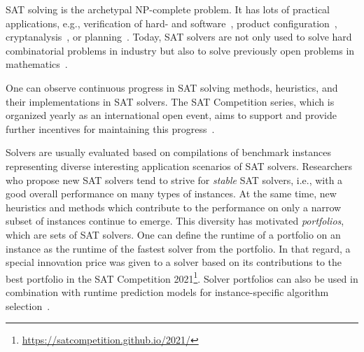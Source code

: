 \documentclass[conference]{IEEEtran}
\begin{document}
SAT solving is the archetypal NP-complete problem. It has lots of practical applications, e.g., verification of hard- and software~\cite{Kaufmann:2021:Amulet,Buning:2020:QPRVerify}, product configuration~\cite{Janota:2014:Configuration}, cryptanalysis~\cite{Nejati:2020:CDCLCrypto}, or planning~\cite{Schreiber:2021:Lilotane}. 
Today, SAT solvers are not only used to solve hard combinatorial problems in industry but also to solve previously open problems in mathematics~\cite{Heule:2016:Pyth,Heule:2018:Schur}. 

One can observe continuous progress in SAT solving methods, heuristics, and their implementations in SAT solvers. 
The SAT Competition series, which is organized yearly as an international open event, aims to support and provide further incentives for maintaining this progress~\cite{balyo2020proceedings}. %

Solvers are usually evaluated based on compilations of benchmark instances representing diverse interesting application scenarios of SAT solvers. 
Researchers who propose new SAT solvers tend to strive for \emph{stable} SAT solvers, i.e., with a good overall performance on many types of instances. 
At the same time, new heuristics and methods which contribute to the performance on only a narrow subset of instances continue to emerge. 
This diversity has motivated \emph{portfolios}, which are sets of SAT solvers.
One can define the runtime of a portfolio on an instance as the runtime of the fastest solver from the portfolio. %
In that regard, a special innovation price was given to a solver based on its contributions to the best portfolio in the SAT Competition 2021\footnote{\url{https://satcompetition.github.io/2021/}}. %
Solver portfolios can also be used in combination with runtime prediction models for instance-specific algorithm selection~\cite{xu2008satzilla}. %
\end{document}
